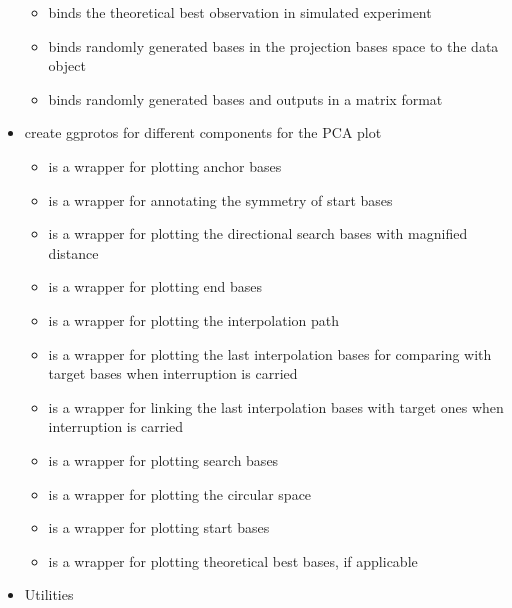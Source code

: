 \begin{itemize}
  \begin{itemize}
  \tightlist
  \item
     binds the theoretical best observation in
    simulated experiment
  \item
     binds randomly generated bases in the
    projection bases space to the data object
  \item
     binds randomly generated bases and
    outputs in a matrix format
  \end{itemize}
\item
   create ggprotos for different components for the PCA
  plot

  \begin{itemize}
  \tightlist
  \item
     is a wrapper for plotting anchor bases
  \item
     is a wrapper for annotating the symmetry of start
    bases
  \item
     is a wrapper for plotting the directional
    search bases with magnified distance
  \item
     is a wrapper for plotting end bases
  \item
     is a wrapper for plotting the interpolation
    path
  \item
     is a wrapper for plotting the last
    interpolation bases for comparing with target bases when
    interruption is carried
  \item
     is a wrapper for linking the last
    interpolation bases with target ones when interruption is carried
  \item
     is a wrapper for plotting search bases
  \item
     is a wrapper for plotting the circular space
  \item
     is a wrapper for plotting start bases
  \item
     is a wrapper for plotting theoretical best bases,
    if applicable
  \end{itemize}
\item
  Utilities


\end{itemize}
